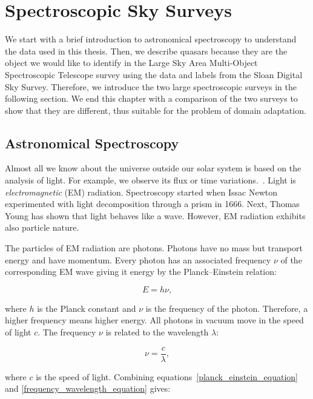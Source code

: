 \chapter{Spectroscopic Sky Surveys}
\label{data_chapter}

We start with a brief introduction to astronomical spectroscopy to understand the data used in this thesis.
Then, we describe quasars because they are the object we would like to identify in the Large Sky Area Multi-Object Spectroscopic Telescope survey using the data and labels from the Sloan Digital Sky Survey.
Therefore, we introduce the two large spectroscopic surveys in the following section.
We end this chapter with a comparison of the two surveys to show
that they are different, thus suitable for the problem of domain adaptation.

\section{Astronomical Spectroscopy}

Almost all we know about the universe outside our solar system is based on the analysis of light.
For example, we observe its flux or time variations.~\cite{appenzeller2012}.
Light is \textit{electromagnetic} (EM) radiation.
Spectroscopy started when Issac Newton experimented with light decomposition through a prism in 1666.
Next, Thomas Young has shown that light behaves like a wave.
However, EM radiation exhibits also particle nature.

The particles of EM radiation are photons.
Photons have no mass but transport energy and have momentum.
Every photon has an associated frequency \(\nu\) of the corresponding EM wave
giving it energy by the Planck--Einstein relation:

\begin{equation}
	E = h \nu,
	\label{planck_einstein_equation}
\end{equation}

where \(h\) is the Planck constant and \(\nu\) is the frequency of the photon.
Therefore, a higher frequency means higher energy.
All photons in vacuum move in the speed of light \(c\).
The frequency \(\nu\) is related to the wavelength \(\lambda\):

\begin{equation}
	\nu = \frac{c}{\lambda},
	\label{frequency_wavelength_equation}
\end{equation}

where \(c\) is the speed of light.
Combining equations~\ref{planck_einstein_equation} and \ref{frequency_wavelength_equation} gives:

